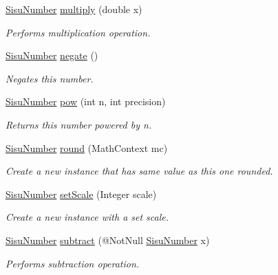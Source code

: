 \begin{DoxyCompactItemize}
\hyperlink{classcom_1_1aarrelaakso_1_1drawl_1_1_sisu_number}{Sisu\+Number} \hyperlink{classcom_1_1aarrelaakso_1_1drawl_1_1_sisu_number_a3255e6ba51f01b287c0acf5121c31d48}{multiply} (double x)
\begin{DoxyCompactList}\small\item\em Performs multiplication operation. \end{DoxyCompactList}\item 
\hyperlink{classcom_1_1aarrelaakso_1_1drawl_1_1_sisu_number}{Sisu\+Number} \hyperlink{classcom_1_1aarrelaakso_1_1drawl_1_1_sisu_number_a2386c00d733c84ee7c97ae11d7d05ea8}{negate} ()
\begin{DoxyCompactList}\small\item\em Negates this number. \end{DoxyCompactList}\item 
\hyperlink{classcom_1_1aarrelaakso_1_1drawl_1_1_sisu_number}{Sisu\+Number} \hyperlink{classcom_1_1aarrelaakso_1_1drawl_1_1_sisu_number_a5946c1e3dcf68a8611e8e7957fe896e0}{pow} (int n, int precision)
\begin{DoxyCompactList}\small\item\em Returns this number powered by n. \end{DoxyCompactList}\item 
\hyperlink{classcom_1_1aarrelaakso_1_1drawl_1_1_sisu_number}{Sisu\+Number} \hyperlink{classcom_1_1aarrelaakso_1_1drawl_1_1_sisu_number_a8e3e3d0dc152b97f0d2c23515e870b52}{round} (Math\+Context mc)
\begin{DoxyCompactList}\small\item\em Create a new instance that has same value as this one rounded. \end{DoxyCompactList}\item 
\hyperlink{classcom_1_1aarrelaakso_1_1drawl_1_1_sisu_number}{Sisu\+Number} \hyperlink{classcom_1_1aarrelaakso_1_1drawl_1_1_sisu_number_ad086a06534f7e4d9f4b61a03f0455c63}{set\+Scale} (Integer scale)
\begin{DoxyCompactList}\small\item\em Create a new instance with a set scale. \end{DoxyCompactList}\item 
\hyperlink{classcom_1_1aarrelaakso_1_1drawl_1_1_sisu_number}{Sisu\+Number} \hyperlink{classcom_1_1aarrelaakso_1_1drawl_1_1_sisu_number_a13158711e8514486fec28dee19db67c8}{subtract} (@Not\+Null \hyperlink{classcom_1_1aarrelaakso_1_1drawl_1_1_sisu_number}{Sisu\+Number} x)
\begin{DoxyCompactList}\small\item\em Performs subtraction operation. \end{DoxyCompactList}\item 

\end{DoxyCompactItemize}
